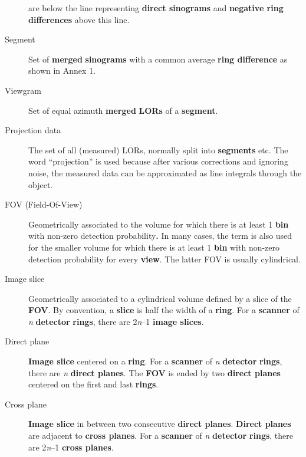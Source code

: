 \documentclass{article}
\begin{document}
\begin{description}
are below the line representing \textbf{direct sinograms} and \textbf{negative 
ring differences} above this line.
\item[Segment] 
Set of \textbf{merged} \textbf{sinograms} with a common average \textbf{ring 
difference} as shown in Annex 1.
\item[Viewgram] 
Set of equal azimuth \textbf{merged} \textbf{LORs} of a \textbf{segment}.
\item[Projection data]
The set of all (measured) LORs, normally split into \textbf{segments} etc.
The word ``projection'' is used because after various corrections and
ignoring noise, the measured data can be approximated as line integrals 
through the object.
\item[FOV (Field-Of-View)] 
Geometrically associated to the volume for which there is at 
least 1 \textbf{bin} with non-zero detection probability\textbf{.} In many 
cases, the term is also used for the smaller volume for which 
there is at least 1 \textbf{bin} with non-zero detection probability 
for every \textbf{view}. The latter FOV is usually cylindrical.
\item[Image slice] 
Geometrically associated to a cylindrical volume defined by 
a slice of the \textbf{FOV}. By convention, a \textbf{slice} is half the 
width of a \textbf{ring}. For a \textbf{scanner} of \textit{n} \textbf{detector} \textbf{rings}, 
there are 2\textit{n}--1 \textbf{image slices}.
\item[Direct plane] 
\textbf{Image slice} centered on a \textbf{ring}. For a \textbf{scanner} of \textit{n} \textbf{detector} \textbf{rings}, 
there are \textit{n} \textbf{direct planes}. The \textbf{FOV} is ended by two \textbf{direct 
planes} centered on the first and last \textbf{rings}.
\item[Cross plane] 
\textbf{Image slice} in between two consecutive \textbf{direct planes}. \textbf{Direct 
planes} are adjacent to \textbf{cross planes}. For a \textbf{scanner} of \textit{n} \textbf{detector} \textbf{rings}, 
there are 2\textit{n}--1 \textbf{cross planes}.
\end{description}
\end{document}
